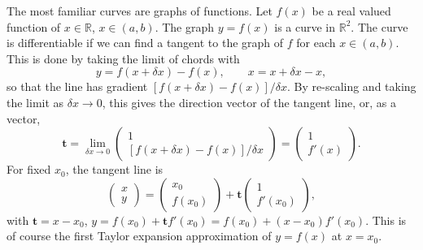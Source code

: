 \documentclass[10pt,notitlepage]{revtex4-1}
\newcommand{\tb}{{\boldsymbol{t}}}
\begin{document}
The most familiar curves are graphs of functions. Let $f(x)$ be a real valued
function of $x\in\mathbb{R}$, $x\in(a,b)$. The graph $y=f(x)$ is a curve in
$\mathbb{R}^2$. The curve is differentiable if we can find a tangent to the
graph of $f$ for each $x\in(a,b)$. This is done by taking the limit of chords
with
\begin{equation}
	y=f(x+\delta x)-f(x),\qquad x=x+\delta x - x,
\end{equation}
so that the line has gradient $[f(x+\delta x)-f(x)]/\delta x$. By re-scaling and
taking the limit as $\delta x\rightarrow0$, this gives the direction vector of
the tangent line, or, as a vector,
\begin{equation}
	\tb=\lim_{\delta x\rightarrow0}\left(\begin{matrix}
	1\\ [f(x+\delta x)-f(x)]/\delta x\end{matrix}\right)=\left(\begin{matrix}
	1\\ f'(x)\end{matrix}\right).
\end{equation}
For fixed $x_0$, the tangent line is
\begin{equation}
	\begin{pmatrix}x\\ y\end{pmatrix}=\begin{pmatrix}x_0 \\ f(x_0)\end{pmatrix}
	+\tb\begin{pmatrix}1\\ f'(x_0)\end{pmatrix},
\end{equation}
with $\tb=x-x_0$, $y=f(x_0)+\tb f'(x_0)=f(x_0)+(x-x_0)f'(x_0)$. This is of
course the first Taylor expansion approximation of $y=f(x)$ at $x=x_0$.
\end{document}
